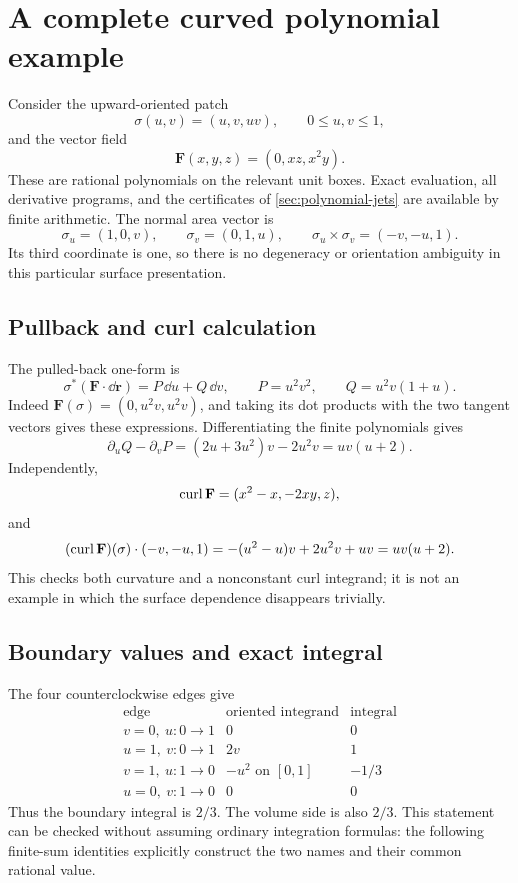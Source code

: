 \section{A complete curved polynomial example}\label{sec:example}

Consider the upward-oriented patch
\[
 \sigma(u,v)=(u,v,uv),\qquad 0\le u,v\le1,
\]
and the vector field
\[
 \mathbf F(x,y,z)=(0,xz,x^2y).
\]
These are rational polynomials on the relevant unit boxes. Exact evaluation,
all derivative programs, and the certificates of
\cref{sec:polynomial-jets} are available by finite arithmetic.
The normal area vector is
\[
 \sigma_u=(1,0,v),\qquad \sigma_v=(0,1,u),\qquad
 \sigma_u\times\sigma_v=(-v,-u,1).
\]
Its third coordinate is one, so there is no degeneracy or orientation
ambiguity in this particular surface presentation.

\subsection{Pullback and curl calculation}

The pulled-back one-form is
\[
 \sigma^*(\mathbf F\cdot\dd\mathbf r)=P\,\dd u+Q\,\dd v,
 \qquad
 P=u^2v^2,\qquad Q=u^2v(1+u).
\]
Indeed $\mathbf F(\sigma)=(0,u^2v,u^2v)$, and taking its dot products
with the two tangent vectors gives these expressions.
Differentiating the finite polynomials gives
\[
 \partial_uQ-\partial_vP=(2u+3u^2)v-2u^2v=uv(u+2).
\]
Independently,
\[
 \operatorname{curl}\mathbf F=(x^2-x,-2xy,z),
\]
and
\[
 (\operatorname{curl}\mathbf F)(\sigma)\cdot(-v,-u,1)
 =-(u^2-u)v+2u^2v+uv=uv(u+2).
\]
This checks both curvature and a nonconstant curl integrand; it is not
an example in which the surface dependence disappears trivially.

\subsection{Boundary values and exact integral}

The four counterclockwise edges give
\[
 \begin{array}{c|c|c}
 \text{edge}&\text{oriented integrand}&\text{integral}\\ \hline
 v=0,\ u:0\to1&0&0\\
 u=1,\ v:0\to1&2v&1\\
 v=1,\ u:1\to0&-u^2\text{ on }[0,1]&-1/3\\
 u=0,\ v:1\to0&0&0
 \end{array}
\]
Thus the boundary integral is $2/3$. The volume side is also $2/3$.
This statement can be checked without assuming ordinary integration
formulas: the following finite-sum identities explicitly construct the
two names and their common rational value.


